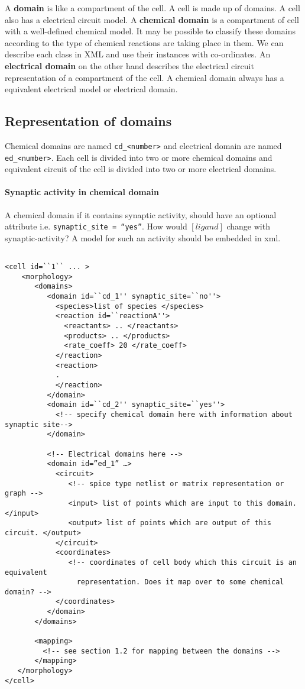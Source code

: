 A \textbf{domain} is like a compartment of the cell. A cell is made up of
domains. A cell also has a electrical circuit model. A \textbf{chemical domain}
is a compartment of cell with a well-defined chemical model. It may be possible
to classify these domains according to the type of chemical reactions are taking
place in them. We can describe each class in XML and use their instances with
co-ordinates. An \textbf{electrical domain} on the other hand describes the
electrical circuit representation of a compartment of the cell.  A chemical
domain always has a equivalent electrical model or electrical domain. 


\subsection{Representation of domains}

Chemical domains are named \texttt{cd\_<number>} and electrical domain are named
\texttt{ed\_<number>}. Each cell is divided into two or more chemical domains and
equivalent circuit of the cell is divided into two or more electrical domains.

\paragraph{Synaptic activity in chemical domain}

 A chemical domain if it contains synaptic activity, should have an optional
 attribute i.e. \texttt{synaptic\_site = ``yes''}. How would $[ligand]$ change
 with synaptic-activity? A model for such an activity should be embedded in
 xml. 

 
\begin{verbatim}

<cell id=``1`` ... >
    <morphology>
       <domains>
          <domain id=``cd_1'' synaptic_site=``no''>
            <species>list of species </species>
            <reaction id=``reactionA''>
              <reactants> .. </reactants>
              <products> .. </products>
              <rate_coeff> 20 </rate_coeff>
            </reaction>
            <reaction>
            .
            </reaction>
          </domain>
          <domain id=``cd_2'' synaptic_site=``yes''>
            <!-- specify chemical domain here with information about synaptic site-->
          </domain>
          
          <!-- Electrical domains here -->
          <domain id=”ed_1” …>
            <circuit> 
               <!-- spice type netlist or matrix representation or graph -->
               <input> list of points which are input to this domain. </input>
               <output> list of points which are output of this circuit. </output> 
            </circuit>
            <coordinates>
               <!-- coordinates of cell body which this circuit is an equivalent 
                 representation. Does it map over to some chemical domain? -->
            </coordinates>
          </domain>
       </domains>

       <mapping> 
         <!-- see section 1.2 for mapping between the domains -->
       </mapping>
   </morphology>
</cell>
\end{verbatim}

